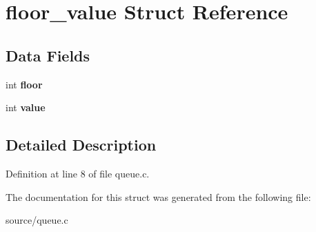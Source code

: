 \hypertarget{structfloor__value}{}\section{floor\+\_\+value Struct Reference}
\label{structfloor__value}
\subsection*{Data Fields}
\begin{DoxyCompactItemize}
\item 
\mbox{\label{structfloor__value_ac95314c9df071676fc22261328c3667c}} 
int {\bfseries floor}
\item 
\mbox{\label{structfloor__value_ae5699934c1b4729a6a25cbf6fc8ca78a}} 
int {\bfseries value}
\end{DoxyCompactItemize}


\subsection{Detailed Description}


Definition at line 8 of file queue.\+c.



The documentation for this struct was generated from the following file\+:\begin{DoxyCompactItemize}
\item 
source/queue.\+c\end{DoxyCompactItemize}
